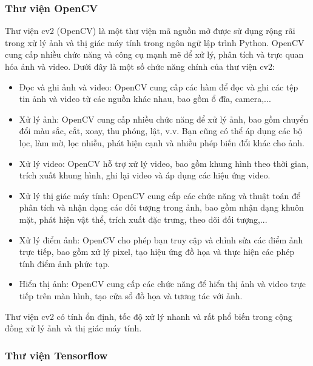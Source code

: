 \subsubsection{Thư viện OpenCV}

Thư viện cv2 (OpenCV) là một thư viện mã nguồn mở được sử dụng rộng rãi trong xử lý ảnh và thị giác máy tính trong ngôn ngữ lập trình Python. OpenCV cung cấp nhiều chức năng và công cụ mạnh mẽ để xử lý, phân tích và trực quan hóa ảnh và video. Dưới đây là một số chức năng chính của thư viện cv2:

\begin{itemize}
	\item Đọc và ghi ảnh và video: OpenCV cung cấp các hàm để đọc và ghi các tệp tin ảnh và video từ các nguồn khác nhau, bao gồm ổ đĩa, camera,...
	
	\item Xử lý ảnh: OpenCV cung cấp nhiều chức năng để xử lý ảnh, bao gồm chuyển đổi màu sắc, cắt, xoay, thu phóng, lật, v.v. Bạn cũng có thể áp dụng các bộ lọc, làm mờ, lọc nhiễu, phát hiện cạnh và nhiều phép biến đổi khác cho ảnh.
	
	\item Xử lý video: OpenCV hỗ trợ xử lý video, bao gồm khung hình theo thời gian, trích xuất khung hình, ghi lại video và áp dụng các hiệu ứng video.
	
	\item Xử lý thị giác máy tính: OpenCV cung cấp các chức năng và thuật toán để phân tích và nhận dạng các đối tượng trong ảnh, bao gồm nhận dạng khuôn mặt, phát hiện vật thể, trích xuất đặc trưng, theo dõi đối tượng,...
	
	\item Xử lý điểm ảnh: OpenCV cho phép bạn truy cập và chỉnh sửa các điểm ảnh trực tiếp, bao gồm xử lý pixel, tạo hiệu ứng đồ họa và thực hiện các phép tính điểm ảnh phức tạp.
	
	\item Hiển thị ảnh: OpenCV cung cấp các chức năng để hiển thị ảnh và video trực tiếp trên màn hình, tạo cửa sổ đồ họa và tương tác với ảnh.
\end{itemize}

Thư viện cv2 có tính ổn định, tốc độ xử lý nhanh và rất phổ biến trong cộng đồng xử lý ảnh và thị giác máy tính.

\subsubsection{Thư viện Tensorflow}

